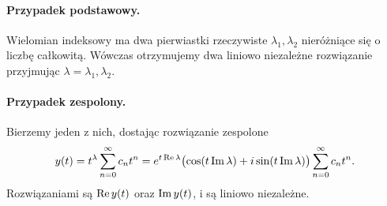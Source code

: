 \paragraph{Przypadek podstawowy.} Wielomian indeksowy ma dwa pierwiastki rzeczywiste $\lambda_1,\lambda_2$ nieróżniące 
się o liczbę 
całkowitą. Wówczas otrzymujemy dwa liniowo niezależne rozwiązanie przyjmując $\lambda = \lambda_1, \lambda_2$.
%
\paragraph{Przypadek zespolony.} Bierzemy jeden z nich, dostając rozwiązanie zespolone
%
\begin{equation*}
  y(t) = t^{\lambda} \sum_{n=0}^{\infty} c_n t^n = e^{t \real \lambda} \p[\big]{\cos (t \imag \lambda) + i \sin 
  (t \imag \lambda)} \sum_{n=0}^{\infty} c_n t^n.
\end{equation*}
%
Rozwiązaniami są $\real y(t)$ oraz $\imag y(t)$, i są liniowo niezależne.
%
